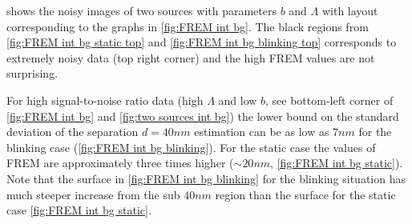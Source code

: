 %
 shows the noisy images of two sources with parameters $b$ and $\Lambda$ with layout corresponding to the graphs in \autoref{fig:FREM int bg}.  The black regions from \autoref{fig:FREM int bg static top} and \autoref{fig:FREM int bg blinking top} corresponds to extremely noisy data (top right corner) and the high FREM values are not surprising. 

For high signal-to-noise ratio data (high $\Lambda$ and low $b$,  see bottom-left corner of \autoref{fig:FREM int bg} and \autoref{fig:two sources int bg}) the lower bound on the standard deviation of the separation $d=40\unit{nm}$ estimation can be as low as $7\unit{nm}$ for the blinking case (\autoref{fig:FREM int bg blinking}). For the static case the values of FREM are approximately three times higher ($\sim 20\unit{nm}$,  \autoref{fig:FREM int bg static}). Note that the surface in \autoref{fig:FREM int bg blinking} for the blinking situation has much steeper increase from the sub $40\unit{nm}$ region than the surface for the static case \autoref{fig:FREM int bg static}.

